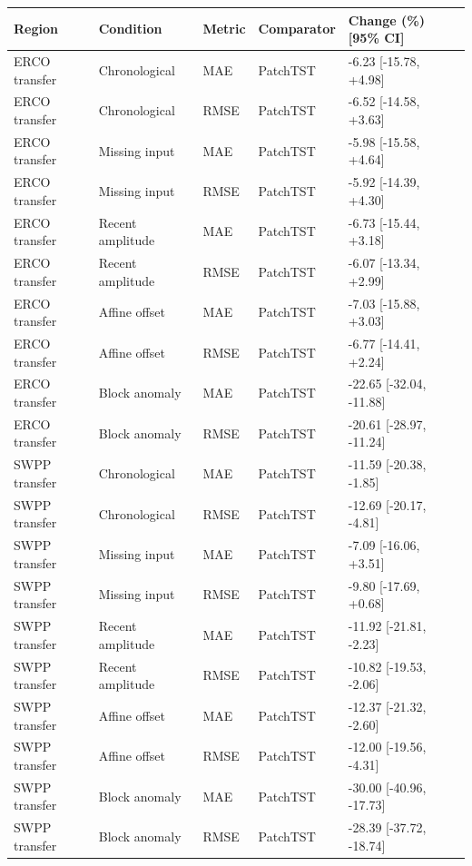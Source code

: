 {
\footnotesize
\begin{longtable}{lp{3.1cm}llp{4.2cm}}
\toprule
Region & Condition & Metric & Comparator & Change (\%) [95\% CI] \\
\midrule
\endhead
ERCO transfer & Chronological & MAE & PatchTST & -6.23 [-15.78, +4.98] \\
ERCO transfer & Chronological & RMSE & PatchTST & -6.52 [-14.58, +3.63] \\
ERCO transfer & Missing input & MAE & PatchTST & -5.98 [-15.58, +4.64] \\
ERCO transfer & Missing input & RMSE & PatchTST & -5.92 [-14.39, +4.30] \\
ERCO transfer & Recent amplitude & MAE & PatchTST & -6.73 [-15.44, +3.18] \\
ERCO transfer & Recent amplitude & RMSE & PatchTST & -6.07 [-13.34, +2.99] \\
ERCO transfer & Affine offset & MAE & PatchTST & -7.03 [-15.88, +3.03] \\
ERCO transfer & Affine offset & RMSE & PatchTST & -6.77 [-14.41, +2.24] \\
ERCO transfer & Block anomaly & MAE & PatchTST & -22.65 [-32.04, -11.88] \\
ERCO transfer & Block anomaly & RMSE & PatchTST & -20.61 [-28.97, -11.24] \\
SWPP transfer & Chronological & MAE & PatchTST & -11.59 [-20.38, -1.85] \\
SWPP transfer & Chronological & RMSE & PatchTST & -12.69 [-20.17, -4.81] \\
SWPP transfer & Missing input & MAE & PatchTST & -7.09 [-16.06, +3.51] \\
SWPP transfer & Missing input & RMSE & PatchTST & -9.80 [-17.69, +0.68] \\
SWPP transfer & Recent amplitude & MAE & PatchTST & -11.92 [-21.81, -2.23] \\
SWPP transfer & Recent amplitude & RMSE & PatchTST & -10.82 [-19.53, -2.06] \\
SWPP transfer & Affine offset & MAE & PatchTST & -12.37 [-21.32, -2.60] \\
SWPP transfer & Affine offset & RMSE & PatchTST & -12.00 [-19.56, -4.31] \\
SWPP transfer & Block anomaly & MAE & PatchTST & -30.00 [-40.96, -17.73] \\
SWPP transfer & Block anomaly & RMSE & PatchTST & -28.39 [-37.72, -18.74] \\
\bottomrule
\end{longtable}
}
